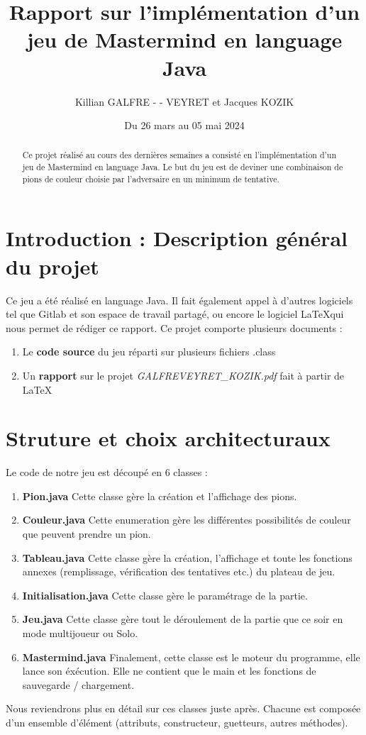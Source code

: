 \documentclass[french]{article}
\title{Rapport sur l'implémentation d'un jeu de Mastermind en language Java}
\author{Killian GALFRE - - VEYRET et Jacques KOZIK}
\date{Du 26 mars au 05 mai 2024}
\begin{document}
\maketitle
\tableofcontents

\begin{abstract}
Ce projet réalisé au cours des dernières semaines a consisté en l'implémentation d'un jeu de Mastermind en language Java. Le but du jeu
est de deviner une combinaison de pions de couleur choisie par l’adversaire en un
minimum de tentative.
\end{abstract}


\section{Introduction : Description général du projet}
Ce jeu a été réalisé en language Java. Il fait également appel à d'autres logiciels tel que Gitlab et son espace de travail partagé, ou encore le logiciel \LaTeX \space qui nous permet de rédiger ce rapport. Ce projet comporte plusieurs documents :
\begin{enumerate}
\item Le \textbf{code source} du jeu réparti sur plusieurs fichiers .class
\item Un \textbf{rapport} sur le projet \textit{GALFREVEYRET\_KOZIK.pdf} fait à partir de \LaTeX
\end{enumerate}


\section{Struture et choix architecturaux}
Le code de notre jeu est découpé en 6 classes :
\begin{enumerate}
\item \textbf{Pion.java} Cette classe gère la création et l'affichage des pions.
\item \textbf{Couleur.java} Cette enumeration gère les différentes possibilités de couleur que peuvent prendre un pion.
\item \textbf{Tableau.java} Cette classe gère la création, l'affichage et toute les fonctions annexes (remplissage, vérification des tentatives etc.) du plateau de jeu.
\item \textbf{Initialisation.java} Cette classe gère le paramétrage de la partie.
\item \textbf{Jeu.java} Cette classe gère tout le déroulement de la partie que ce soir en mode multijoueur ou Solo.
\item \textbf{Mastermind.java} Finalement, cette classe est le moteur du programme, elle lance son éxécution. Elle ne contient que le main et les fonctions de sauvegarde / chargement.
\end{enumerate} 
Nous reviendrons plus en détail sur ces classes juste après. Chacune est composée d'un ensemble d'élément (attributs, constructeur, guetteurs, autres méthodes).
\end{document}
